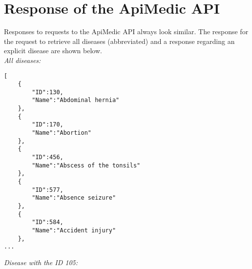\section{Response of the ApiMedic API}
Responses to requests to the ApiMedic API always look similar. The response for the request to retrieve all diseases (abbreviated) and a response regarding an explicit disease are shown below.
\newline \\
\textit{All diseases:} 
\begin{lstlisting}[caption={Abbreviated Reponse of all Diseases ApiMedic API}]
[
	{
		"ID":130,
		"Name":"Abdominal hernia"
	},
	{
		"ID":170,
		"Name":"Abortion"
	},
	{
		"ID":456,
		"Name":"Abscess of the tonsils"
	},
	{
		"ID":577,
		"Name":"Absence seizure"
	},
	{
		"ID":584,
		"Name":"Accident injury"
	},
...
\end{lstlisting}
\vspace{1cm}
\textit{Disease with the ID 105:} 
